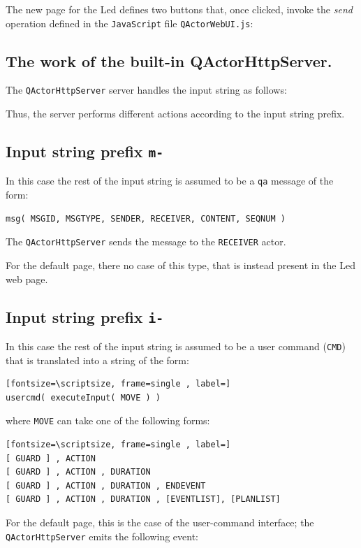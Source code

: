 The new page for the Led defines two buttons that, once clicked, invoke the \textit{send} operation defined in the \texttt{JavaScript} file \texttt{QActorWebUI.js}:



\subsection{The work of the built-in QActorHttpServer.} 
 
The \texttt{QActorHttpServer} server handles the input string as follows: 

 

Thus, the server performs different actions according to the input string prefix.

\subsection{Input string prefix \texttt{\textbf{m-}}} 
In this case the rest of the input string is assumed to be a \texttt{qa} message of the form:
\medskip
\begin{lstlisting}
msg( MSGID, MSGTYPE, SENDER, RECEIVER, CONTENT, SEQNUM )
\end{lstlisting}
The \texttt{QActorHttpServer} sends the message to the \texttt{RECEIVER} actor.

For the default page, there no case of this type, that is instead present in the Led web page.

\subsection{Input string prefix \texttt{\textbf{i-}}} 
In this case the rest of the input string is assumed to be a user command (\texttt{CMD}) that is translated into a string of the form:
\medskip   
\begin{Verbatim}[fontsize=\scriptsize, frame=single , label=]
usercmd( executeInput( MOVE ) )
\end{Verbatim}
where \texttt{MOVE} can take one of the following forms:
\medskip
\begin{Verbatim}[fontsize=\scriptsize, frame=single , label=]                                  
[ GUARD ] , ACTION
[ GUARD ] , ACTION , DURATION
[ GUARD ] , ACTION , DURATION , ENDEVENT
[ GUARD ] , ACTION , DURATION , [EVENTLIST], [PLANLIST]
\end{Verbatim}
For the default page, this is the case of the user-command interface; the  \texttt{QActorHttpServer}  emits the following event:

